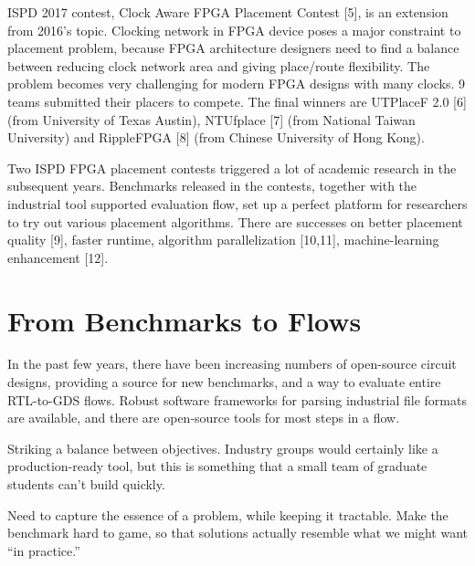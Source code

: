 \documentclass[sigconf]{acmart}
\begin{document}
ISPD 2017 contest, Clock Aware FPGA Placement Contest\cite{sy5} [5], is an
extension from 2016’s topic. Clocking network in FPGA device poses a
major constraint to placement problem, because FPGA architecture
designers need to find a balance between reducing clock network area
and giving place/route flexibility. The problem becomes very
challenging for modern FPGA designs with many clocks. 9 teams
submitted their placers to compete. The final winners are UTPlaceF 2.0
\cite{sy6}[6] (from University of Texas Austin), NTUfplace\cite{sy7} [7] (from National
Taiwan University) and RippleFPGA\cite{sy8} [8] (from Chinese University of Hong
Kong).

Two ISPD FPGA placement contests triggered a lot of academic research
in the subsequent years. Benchmarks released in the contests, together
with the industrial tool supported evaluation flow, set up a perfect
platform for researchers to try out various placement
algorithms. There are successes on better placement quality\cite{sy9} [9],
faster runtime, algorithm parallelization\cite{sy10,sy11} [10,11], machine-learning
enhancement\cite{sy12} [12].



\iffalse
\subsection{Deep Learning Accelerator Placement, 2020}

Include this?  Not really placement, but placement-ish?
\fi


\section{From Benchmarks to Flows}

In the past few years, there have been increasing
numbers of open-source circuit designs,
providing a source 
for new benchmarks, and a way to evaluate entire
RTL-to-GDS flows.  Robust software frameworks for
parsing industrial file formats are available,
and there are open-source tools for most steps
in a flow.

\iffalse

Striking a balance between objectives.  Industry groups
would certainly like a production-ready tool, but this is
something that a small team of graduate students can't
build quickly.

Need to capture the essence of a problem, while keeping it
tractable.  Make the benchmark hard to game, so that solutions
actually resemble what we might want ``in practice.''
\end{document}
